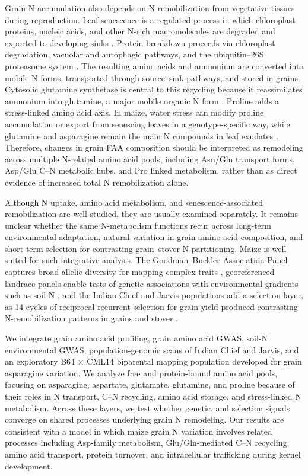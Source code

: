 Grain N accumulation also depends on N remobilization from vegetative tissues during reproduction. Leaf senescence is a regulated process in which chloroplast proteins, nucleic acids, and other N-rich macromolecules are degraded and exported to developing sinks \citep{Have2017NRemobilization,Sakuraba2022NStarvationSenescence}. Protein breakdown proceeds via chloroplast degradation, vacuolar and autophagic pathways, and the ubiquitin--26S proteasome system \citep{Liu2008ProteinDegradationNRemobilization,Have2017NRemobilization}. The resulting amino acids and ammonium are converted into mobile N forms, transported through source--sink pathways, and stored in grains. Cytosolic glutamine synthetase is central to this recycling because it reassimilates ammonium into glutamine, a major mobile organic N form \citep{Bernard2009CytosolicGS}. Proline adds a stress-linked amino acid axis. In maize, water stress can modify proline accumulation or export from senescing leaves in a genotype-specific way, while glutamine and asparagine remain the main N compounds in leaf exudates \citep{Carceller1999ProlineRemobilization}. Therefore, changes in grain FAA composition should be interpreted as remodeling across multiple N-related amino acid pools, including Asn/Gln transport forms, Asp/Glu C--N metabolic hubs, and Pro linked metabolism, rather than as direct evidence of increased total N remobilization alone.


Although N uptake, amino acid metabolism, and senescence-associated remobilization are well studied, they are usually examined separately. It remains unclear whether the same N-metabolism functions recur across long-term environmental adaptation, natural variation in grain amino acid composition, and short-term selection for contrasting grain–stover N partitioning. Maize is well suited for such integrative analysis. The Goodman–Buckler Association Panel captures broad allelic diversity for mapping complex traits \citep{FlintGarcia2005Goodman}, georeferenced landrace panels enable tests of genetic associations with environmental gradients such as soil N \citep{RomeroNavarro2017Landraces}, and the Indian Chief and Jarvis populations add a selection layer, as 14 cycles of reciprocal recurrent selection for grain yield produced contrasting N-remobilization patterns in grains and stover \citep{Moll1994}.

We integrate grain amino acid profiling, grain amino acid GWAS, soil-N environmental GWAS, population-genomic scans of Indian Chief and Jarvis, and an exploratory B64 × CML14 biparental mapping population developed for grain asparagine variation. We analyze free and protein-bound amino acid pools, focusing on asparagine, aspartate, glutamate, glutamine, and proline because of their roles in N transport, C–N recycling, amino acid storage, and stress-linked N metabolism. Across these layers, we test whether genetic, and selection signals converge on shared processes underlying grain N remodeling. Our results are consistent with a model in which maize grain N variation involves related processes including Asp-family metabolism, Glu/Gln-mediated C–N recycling, amino acid transport, protein turnover, and intracellular trafficking during kernel development.

